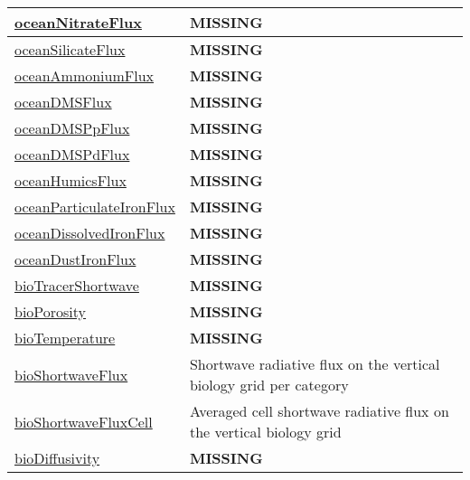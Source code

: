 {\begin{center}
\begin{longtable}{| p{2.0in} | p{4.0in} |}
    \hline
    \hyperref[subsec:var_sec_biogeochemistry_oceanNitrateFlux]{oceanNitrateFlux} & {\bf \color{red} MISSING} \\
    \hline
    \hyperref[subsec:var_sec_biogeochemistry_oceanSilicateFlux]{oceanSilicateFlux} & {\bf \color{red} MISSING} \\
    \hline
    \hyperref[subsec:var_sec_biogeochemistry_oceanAmmoniumFlux]{oceanAmmoniumFlux} & {\bf \color{red} MISSING} \\
    \hline
    \hyperref[subsec:var_sec_biogeochemistry_oceanDMSFlux]{oceanDMSFlux} & {\bf \color{red} MISSING} \\
    \hline
    \hyperref[subsec:var_sec_biogeochemistry_oceanDMSPpFlux]{oceanDMSPpFlux} & {\bf \color{red} MISSING} \\
    \hline
    \hyperref[subsec:var_sec_biogeochemistry_oceanDMSPdFlux]{oceanDMSPdFlux} & {\bf \color{red} MISSING} \\
    \hline
    \hyperref[subsec:var_sec_biogeochemistry_oceanHumicsFlux]{oceanHumicsFlux} & {\bf \color{red} MISSING} \\
    \hline
    \hyperref[subsec:var_sec_biogeochemistry_oceanParticulateIronFlux]{oceanParticulateIronFlux} & {\bf \color{red} MISSING} \\
    \hline
    \hyperref[subsec:var_sec_biogeochemistry_oceanDissolvedIronFlux]{oceanDissolvedIronFlux} & {\bf \color{red} MISSING} \\
    \hline
    \hyperref[subsec:var_sec_biogeochemistry_oceanDustIronFlux]{oceanDustIronFlux} & {\bf \color{red} MISSING} \\
    \hline
    \hyperref[subsec:var_sec_biogeochemistry_bioTracerShortwave]{bioTracerShortwave} & {\bf \color{red} MISSING} \\
    \hline
    \hyperref[subsec:var_sec_biogeochemistry_bioPorosity]{bioPorosity} & {\bf \color{red} MISSING} \\
    \hline
    \hyperref[subsec:var_sec_biogeochemistry_bioTemperature]{bioTemperature} & {\bf \color{red} MISSING} \\
    \hline
    \hyperref[subsec:var_sec_biogeochemistry_bioShortwaveFlux]{bioShortwaveFlux} & Shortwave radiative flux on the vertical biology grid per category \\
    \hline
    \hyperref[subsec:var_sec_biogeochemistry_bioShortwaveFluxCell]{bioShortwaveFluxCell} & Averaged cell shortwave radiative flux on the vertical biology grid \\
    \hline
    \hyperref[subsec:var_sec_biogeochemistry_bioDiffusivity]{bioDiffusivity} & {\bf \color{red} MISSING} \\

\end{longtable}
\end{center}}
